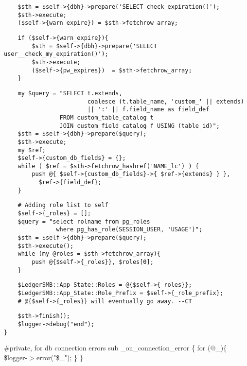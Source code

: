 \begin{verbatim}
    $sth = $self->{dbh}->prepare('SELECT check_expiration()');
    $sth->execute;
    ($self->{warn_expire}) = $sth->fetchrow_array;
\end{verbatim}
\begin{verbatim}
    if ($self->{warn_expire}){
        $sth = $self->{dbh}->prepare('SELECT user__check_my_expiration()');
        $sth->execute;
        ($self->{pw_expires})  = $sth->fetchrow_array;
    }
\end{verbatim}
\begin{verbatim}
    my $query = "SELECT t.extends, 
                        coalesce (t.table_name, 'custom_' || extends) 
                        || ':' || f.field_name as field_def
                FROM custom_table_catalog t
                JOIN custom_field_catalog f USING (table_id)";
    $sth = $self->{dbh}->prepare($query);
    $sth->execute;
    my $ref;
    $self->{custom_db_fields} = {};
    while ( $ref = $sth->fetchrow_hashref('NAME_lc') ) {
        push @{ $self->{custom_db_fields}->{ $ref->{extends} } },
          $ref->{field_def};
    }
\end{verbatim}
\begin{verbatim}
    # Adding role list to self 
    $self->{_roles} = [];
    $query = "select rolname from pg_roles 
               where pg_has_role(SESSION_USER, 'USAGE')";
    $sth = $self->{dbh}->prepare($query);
    $sth->execute();
    while (my @roles = $sth->fetchrow_array){
        push @{$self->{_roles}}, $roles[0];
    }
\end{verbatim}
\begin{verbatim}
    $LedgerSMB::App_State::Roles = @{$self->{_roles}};
    $LedgerSMB::App_State::Role_Prefix = $self->{_role_prefix};
    # @{$self->{_roles}} will eventually go away. --CT
\end{verbatim}
\begin{verbatim}
    $sth->finish();
    $logger->debug("end");
}
\end{verbatim}


\#private, for db connection errors
sub \_on\_connection\_error \{
    for (@\_)\{
        \$logger-$>$error("\$\_");
    \}
\}



